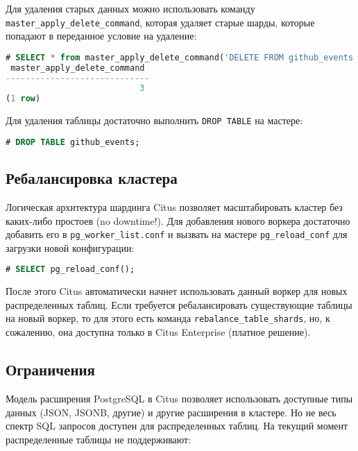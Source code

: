Для удаления старых данных можно использовать команду \lstinline!master_apply_delete_command!, которая удаляет старые шарды, которые попадают в переданное условие на удаление:

\begin{lstlisting}[language=SQL,label=lst:citus_append4,caption=Удаление старых шардов]
# SELECT * from master_apply_delete_command('DELETE FROM github_events WHERE created_at >= ''2015-01-01 00:00:00''');
 master_apply_delete_command
-----------------------------
                           3
(1 row)
\end{lstlisting}

Для удаления таблицы достаточно выполнить \lstinline!DROP TABLE! на мастере:

\begin{lstlisting}[language=SQL,label=lst:citus_append5,caption=Удаление таблицы]
# DROP TABLE github_events;
\end{lstlisting}



\subsection{Ребалансировка кластера}

Логическая архитектура шардинга Citus позволяет масштабировать кластер без каких-либо простоев (no downtime!). Для добавления нового воркера достаточно добавить его в \lstinline!pg_worker_list.conf! и вызвать на мастере \lstinline!pg_reload_conf! для загрузки новой конфигурации:

\begin{lstlisting}[language=SQL,label=lst:citus_balance1,caption=Загрузка новой конфигурации]
# SELECT pg_reload_conf();
\end{lstlisting}

После этого Citus автоматически начнет использовать данный воркер для новых распределенных таблиц. Если требуется ребалансировать существующие таблицы на новый воркер, то для этого есть команда \lstinline!rebalance_table_shards!, но, к сожалению, она доступна только в Citus Enterprise (платное решение).


\subsection{Ограничения}

Модель расширения PostgreSQL в Citus позволяет использовать доступные типы данных (JSON, JSONB, другие) и другие расширения в кластере. Но не весь спектр SQL запросов доступен для распределенных таблиц. На текущий момент распределенные таблицы не поддерживают:

